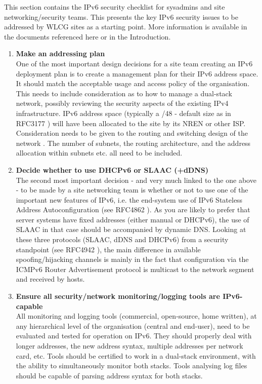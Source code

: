 
This section contains the IPv6 security checklist for sysadmins and site
networking/security teams. This presents the key IPv6 security issues to be
addressed by WLCG sites as a starting point. More information is available in
the documents referenced here or in the Introduction. 



\begin{enumerate}


\item {\bf Make an addressing plan}\\
One of the most important design decisions for a site team creating
an IPv6 deployment plan is to create a management plan for their IPv6 address space.
It should match the acceptable usage and access policy of the organisation.
This needs to include consideration as to how to manage a dual-stack network,
possibly reviewing the security aspects of the existing IPv4 infrastructure.
IPv6 address space (typically a /48 - default size as in RFC3177 \cite{rfc})
will have been allocated to the site by its NREN or other ISP. Consideration
needs to be given to the routing and switching design of the network
\cite{planningguides}. The number of subnets, the routing architecture,
and the address allocation within subnets etc. all need to be included. 


\item {\bf Decide whether to use DHCPv6 or SLAAC (+dDNS)} \\
The second most important decision - and very much linked to the one above -
to be made by a site networking team is whether or not to use one of the important
new features of IPv6, i.e. the end-system use of  IPv6 Stateless Address
Autoconfiguration (see RFC4862 \cite{rfc}).
As you are likely to prefer that server systems have fixed addresses
(either manual or DHCPv6), the use of SLAAC in that case should be accompanied by
dynamic DNS. Looking at these three protocols (SLAAC, dDNS and DHCPv6) from a
security standpoint (see RFC4942 \cite{rfc}), the main difference in available
spoofing/hijacking channels is mainly in the fact that configuration via the ICMPv6
Router Advertisement protocol is multicast to the network segment and received
by hosts.


\item {\bf Ensure all security/network monitoring/logging tools are IPv6-capable}\\
All monitoring and logging tools (commercial, open-source, home written),
at any hierarchical level of the organisation (central and end-user),
need to be evaluated and tested for operation on IPv6.
They should properly deal with longer addresses, the new address syntax, multiple
addresses per network card, etc.
Tools should be certified to work in a dual-stack environment, with the
ability to simultaneously monitor both stacks. Tools analysing log files
should be capable of parsing address syntax for both stacks.


\end{enumerate}
